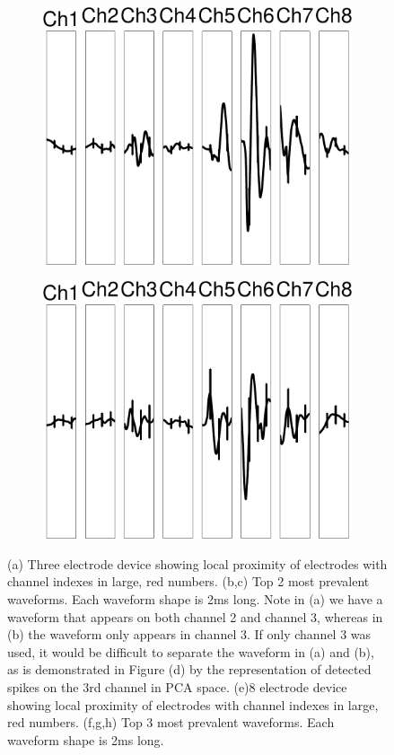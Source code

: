 \begin{center}
\begin{figure}
\begin{subfigure}[b]{.28\textwidth}
\includegraphics[width=\textwidth]{../figs/8devim/clus9}
\caption{}
\label{ex82}
\end{subfigure}
\begin{subfigure}[b]{.28\textwidth}
\includegraphics[width=\textwidth]{../figs/8devim/clus6}
\caption{}
\label{ex83}
\end{subfigure}
\caption{
(a) Three electrode device showing local proximity of electrodes with channel indexes in large, red numbers. (b,c) Top 2 most prevalent waveforms.  Each waveform shape is 2ms long.   Note in (a) we have a waveform that appears on both channel 2 and channel 3, whereas in (b) the waveform only appears in channel 3.  If only channel 3 was used, it would be difficult to separate the waveform in (a) and (b), as is demonstrated in Figure (d) by the representation of detected spikes on the 3rd channel in PCA space.
(e)8 electrode device showing local proximity of electrodes with channel indexes in large, red numbers. (f,g,h) Top 3 most prevalent waveforms.  Each waveform shape is 2ms long.}
\end{figure}
\end{center}
